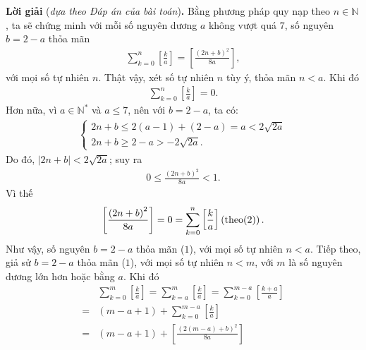 \begin{multicols}{2}
	\vskip 0.05cm
	\textbf{\color{thachthuctoanhoc}Lời giải} (\textit{dựa theo Đáp án của bài toán})\textbf{\color{thachthuctoanhoc}.}
	\vskip 0.05cm
	Bằng phương pháp quy nạp theo $n \in \mathbb{N}$, ta sẽ chứng minh với mỗi số nguyên dương $a$ không vượt quá $7$, số nguyên $b = 2 - a$ thỏa mãn
	\begin{align*}
		\sum\limits_{k = 0}^n {\left[ {\frac{k}{a}} \right]}  = \left[ {\frac{{{{\left( {2n + b} \right)}^2}}}{{8a}}} \right], \tag{$1$}
	\end{align*}
	với mọi số tự nhiên $n$.
	\vskip 0.05cm
	Thật vậy, xét số tự nhiên $n$ tùy ý, thỏa mãn $n < a$.
	\vskip 0.05cm
	Khi đó
	\begin{align*}
		\sum\limits_{k = 0}^n {\left[ {\frac{k}{a}} \right]}  = 0. \tag{$2$}
	\end{align*}
	Hơn nữa, vì $a \in \mathbb{N^*}$  và $a \le 7$, nên với \linebreak $b = 2 - a$, ta có:
	\begin{align*}
		\begin{cases}
			2n + b \le 2(a-1) + (2-a) = a < 2\sqrt{2a}\\
			2n + b \ge 2 - a > - 2\sqrt{2a}.
		\end{cases}
	\end{align*}
	Do đó, $|2n + b| < 2\sqrt {2a}$;  suy ra
	\begin{align*}
		0 \le \frac{{{{\left( {2n + b} \right)}^2}}}{{8a}} < 1.
	\end{align*}
	Vì thế
	\begin{align*}
		\left[ {\frac{{{{\left( {2n + b} \right)}^2}}}{{8a}}} \right] = 0 = \sum\limits_{k = 0}^n {\left[ {\frac{k}{a}} \right]} \left( {{\rm{theo}}(2)} \right).
	\end{align*}
	Như vậy, số nguyên $b = 2 - a$ thỏa mãn ($1$), với mọi số tự nhiên $n < a$.
	\vskip 0.05cm
	Tiếp theo, giả sử $b = 2 - a$ thỏa mãn ($1$), với mọi số tự nhiên $n < m$, với $m$ là số nguyên dương lớn hơn hoặc bằng $a$.
	\vskip 0.05cm
	\columnbreak
	Khi đó
	\begin{align*}
			&\sum\limits_{k = 0}^m {\left[ {\frac{k}{a}} \right]}  = \sum\limits_{k = a}^m {\left[ {\frac{k}{a}} \right]}  = \sum\limits_{k = 0}^{m - a} {\left[ {\frac{{k + a}}{a}} \right]} \\
			 = &\left( {m - a + 1} \right) + \sum\limits_{k = 0}^{m - a} {\left[ {\frac{k}{a}} \right]} \\
			= &\left( {m - a + 1} \right) + \left[ {\frac{{{{\left( {2\left( {m - a} \right) + b} \right)}^2}}}{{8a}}} \right] \tag{$3$}\\

\end{align*}
\end{multicols}
